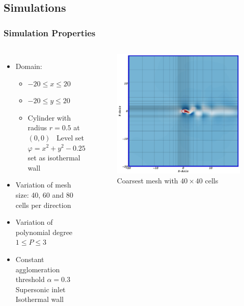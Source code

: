 	\subsection{Simulations}
		\begin{frame}
			\frametitle{Simulation Properties}
			\begin{columns}[t]
				\column[]{7cm}
				\vspace{-0.5cm}
			\begin{itemize}
				\item Domain:
				\begin{itemize}
					\item $-20 \leq x \leq 20$
					\item $-20 \leq y \leq 20$
					\item Cylinder with radius $r=0.5$ at $(0,0)$ \newline \MVRightarrow \, Level set $\varphi  = x^2 + y^2 -0.25$ set as  \color{myred} isothermal wall \color{black}
				\end{itemize}
				
				\item Variation of mesh size: 40, 60 and 80 cells per direction
				\item Variation of polynomial degree $1 \leq P \leq 3$
				\item Constant agglomeration threshold $\alpha = 0.3$ \\[10pt]
				\bluedot Supersonic inlet
				\reddot Isothermal wall
			\end{itemize}
			\column[]{5.5cm}
			\vspace{-0.8cm}
			\begin{figure}[htbp]
				\includegraphics[width=\textwidth]{img/mesh40.PNG}
				\caption{Coarsest mesh with $40 \times 40$ cells}
			\end{figure} 
		\end{columns}
		\end{frame}
